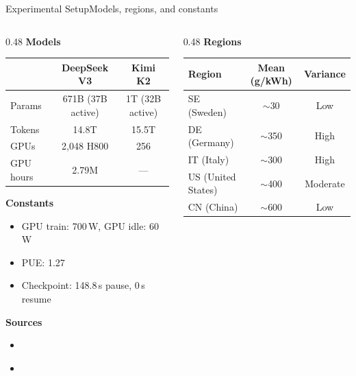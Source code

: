 \begin{frame}[t]{Experimental Setup}{Models, regions, and constants}

  \small
  \begin{columns}[T]
    \begin{column}{0.48\textwidth}
      \textbf{Models}
      \vspace{0.1cm}
      \begin{tabular}{l|c|c}
        \toprule
        & \textbf{DeepSeek V3} & \textbf{Kimi K2} \\
        \midrule
        Params & 671B (37B active) & 1T (32B active) \\
        Tokens & 14.8T & 15.5T \\
        GPUs & 2,048 H800 & 256 \\
        GPU hours & 2.79M & --- \\
        \bottomrule
      \end{tabular}

      \vspace{0.3cm}
      \textbf{Constants}
      \begin{itemize}
        \item GPU train: 700\,W, GPU idle: 60\,W
        \item PUE: 1.27
        \item Checkpoint: 148.8\,s pause, 0\,s resume
      \end{itemize}
      \vspace{0.3cm}
      \textbf{Sources}
      \begin{itemize}
        \item \textcite{kimi_team_kimi_2025}
        \item \textcite{deepseek-ai_deepseek-v3_2024}
      \end{itemize}
    \end{column}
    \begin{column}{0.48\textwidth}
      \textbf{Regions}
      \vspace{0.1cm}
      \begin{tabular}{l|c|c}
        \toprule
        Region & Mean (g/kWh) & Variance \\
        \midrule
        SE (Sweden) & $\sim$30 & Low \\
        DE (Germany) & $\sim$350 & High \\
        IT (Italy) & $\sim$300 & High \\
        US (United States) & $\sim$400 & Moderate \\
        CN (China) & $\sim$600 & Low \\
        \bottomrule
      \end{tabular}


\end{column}
\end{columns}
\end{frame}
